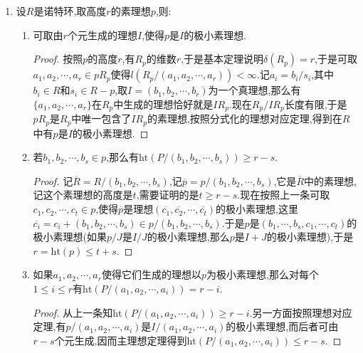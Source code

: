 \begin{enumerate}
\begin{enumerate}
\begin{proof}
        	下面设$f$不落在$A$的每个极小素理想中,任取$f$的极小素理想$\mathfrak{p}$,主理想定理说明$\mathrm{ht}(\mathfrak{p})\le1$,但是由于$\mathfrak{p}$不是极小素理想,导致$\mathrm{ht}(\mathfrak{p})\not=0$,于是只能有$\mathfrak{p}$的高度是1.于是有$\dim A/fA+1\le\dim A$.这得到等式.
        \end{proof}
	\end{enumerate}
	\item 设$R$是诺特环,取高度$r$的素理想$p$,则:
	\begin{enumerate}
		\item 可取由$r$个元生成的理想$I$,使得$p$是$I$的极小素理想.
		\begin{proof}
			
			按照$p$的高度$r$,有$R_p$的维数$r$,于是基本定理说明$\delta(R_p)=r$,于是可取$a_1,a_2,\cdots,a_r\in pR_p$使得$l(R_p/(a_1,a_2,\cdots,a_r))<\infty$.记$a_i=b_i/s_i$,其中$b_i\in R$和$s_i\in R-p$,取$I=(b_1,b_2,\cdots,b_r)$为一个真理想,那么有$\{a_1,a_2,\cdots,a_r\}$在$R_p$中生成的理想恰好就是$IR_p$.现在$R_p/IR_p$长度有限,于是$pR_p$是$R_p$中唯一包含了$IR_p$的素理想,按照分式化的理想对应定理,得到在$R$中有$p$是$I$的极小素理想.
		\end{proof}
		\item 若$b_1,b_2,\cdots,b_s\in p$,那么有$\mathrm{ht}(P/(b_1,b_2,\cdots,b_s))\ge r-s$.
		\begin{proof}
			
			记$\overline{R}=R/(b_1,b_2,\cdots,b_s)$,记$\overline{p}=p/(b_1,b_2,\cdots,b_s)$,它是$\overline{R}$中的素理想,记这个素理想的高度是$t$,需要证明的是$t\ge r-s$.现在按照上一条可取$c_1,c_2,\cdots,c_t\in p$,使得$\overline{p}$是理想$(\overline{c_1},\overline{c_2},\cdots,\overline{c_t})$的极小素理想,这里$\overline{c_i}=c_i+(b_1,b_2,\cdots,b_s)\in p/(b_1,b_2,\cdots,b_s)$.于是$p$是$(b_1,\cdots,b_s,c_1,\cdots,c_t)$的极小素理想(如果$p/J$是$I/J$的极小素理想,那么$p$是$I+J$的极小素理想),于是$r=\mathrm{ht}(p)\le t+s$.
		\end{proof}
		\item 如果$a_1,a_2,\cdots,a_r$使得它们生成的理想以$p$为极小素理想,那么对每个$1\le i\le r$有$\mathrm{ht}(P/(a_1,a_2,\cdots,a_i))=r-i$.
		\begin{proof}
			
			从上一条知$\mathrm{ht}(P/(a_1,a_2,\cdots,a_i))\ge r-i$.另一方面按照理想对应定理,有$p/(a_1,a_2,\cdots,a_i)$是$I/(a_1,a_2,\cdots,a_i)$的极小素理想,而后者可由$r-s$个元生成,因而主理想定理得到$\mathrm{ht}(P/(a_1,a_2,\cdots,a_i))\le r-s$.
		\end{proof}
	\end{enumerate}
\end{enumerate}

